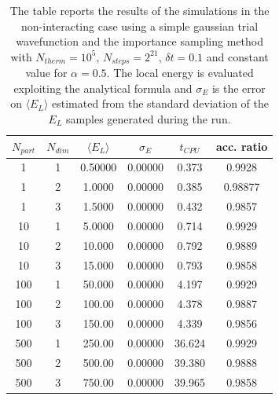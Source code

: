 \begin{table}[H]
    \centering
    \begin{tabular}{cccccc}
    \toprule
    $N_{part}$ & $N_{dim}$ & $\langle E_L \rangle$ & $\sigma_E$ & $t_{CPU}$ & acc. ratio \\
    \midrule
    1 & 1 & 0.50000 & 0.00000 & 0.373 & 0.9928  \\
    1 & 2 & 1.0000 & 0.00000 & 0.385 & 0.98877 \\
    1 & 3 & 1.5000 & 0.00000 & 0.432 & 0.9857 \\
    \midrule
    10 & 1 & 5.0000 & 0.00000 & 0.714 & 0.9929 \\
    10 & 2 & 10.000 & 0.00000 & 0.792 & 0.9889 \\
    10 & 3 & 15.000 & 0.00000 & 0.793 &  0.9858 \\
    \midrule
    100 & 1 & 50.000 & 0.00000 & 4.197 & 0.9929 \\
    100 & 2 & 100.00 & 0.00000 & 4.378 & 0.9887 \\
    100 & 3 & 150.00 & 0.00000 &  4.339 & 0.9856 \\
    \midrule
    500 & 1 & 250.00 & 0.00000 & 36.624 & 0.9929 \\
    500 & 2 & 500.00 & 0.00000 & 39.380 & 0.9888 \\
    500 & 3 & 750.00 & 0.00000 & 39.965 & 0.9858 \\
    \bottomrule
    \end{tabular}
    \caption{The table reports the results of the simulations in the non-interacting case using a simple gaussian trial wavefunction and the importance sampling method with $N_{therm}=10^5$, $N_{steps}=2^{21}$, $\delta t = 0.1$ and constant value for $\alpha=0.5$. The local energy is evaluated exploiting the analytical formula and $\sigma_E$ is the error on $\langle E_L \rangle$ estimated from the standard deviation of the $E_L$ samples generated during the run. }
    \label{tab:tab_x_importance_analytical}
\end{table}

